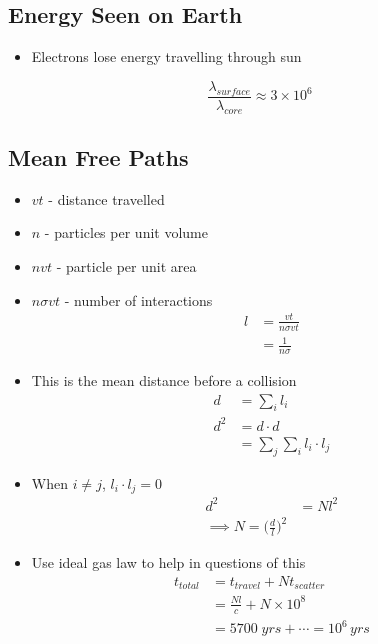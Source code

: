 \documentclass[a4paper,11pt,normalem]{article}
\begin{document}
\subsection{Energy Seen on Earth}

\begin{itemize}
    \item Electrons lose energy travelling through sun
\end{itemize}

\[
    \frac{\lambda_{surface}}{\lambda_{core}} \approx 3\times10^6
\]

\subsection{Mean Free Paths}

\begin{itemize}
    \item \(vt\) - distance travelled
    \item \(n\) - particles per unit volume
    \item \(nvt\) - particle per unit area
    \item \(n\sigma vt\) - number of interactions
        \begin{align*}
            l &= \frac{vt}{n\sigma vt} \\
            &= \frac{1}{n\sigma}
        \end{align*}
    \item This is the mean distance before a collision
        \begin{align*}
            d &= \sum_i l_i \\
            d^2 &= d \cdot d \\
            &= \sum_j \sum_i l_i \cdot l_j
        \end{align*}
    \item When \(i \neq j\), \(l_i \cdot l_j = 0\)
        \begin{align*}
            d^2 &= Nl^2 \\
            \implies N = \bigg(\frac{d}{l}\bigg)^2
        \end{align*}
    \item Use ideal gas law to help in questions of this
        \begin{align*}
            t_{total} &= t_{travel} + Nt_{scatter} \\
            &= \frac{Nl}{c} + N\times 10^8 \\
            &= 5700\;yrs + \cdots = 10^6 \, yrs
        \end{align*}
\end{itemize}
\end{document}
